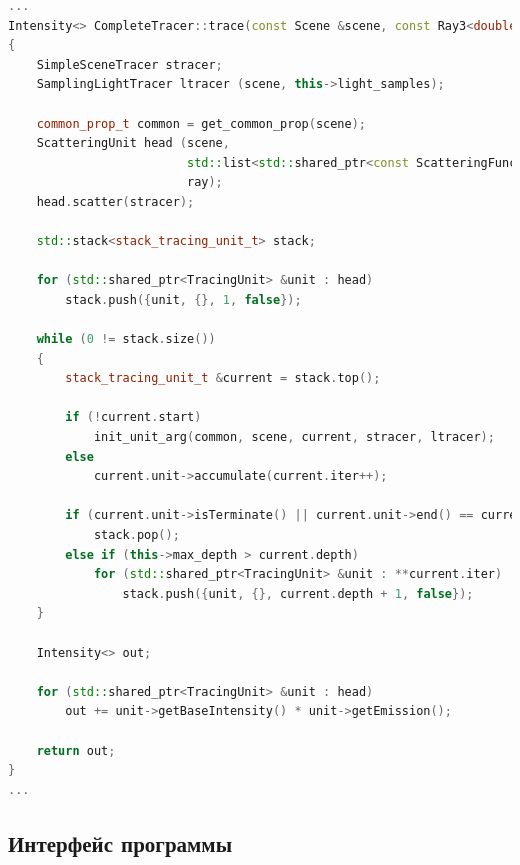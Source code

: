 


\begin{lstlisting}[language=c++, label={code_complete_tracer-cpp}, caption={Листинг кода трассировщика в алогритме трассировки путей (2)}]
...
Intensity<> CompleteTracer::trace(const Scene &scene, const Ray3<double> &ray) const
{
    SimpleSceneTracer stracer;
    SamplingLightTracer ltracer (scene, this->light_samples);

    common_prop_t common = get_common_prop(scene);
    ScatteringUnit head (scene,
                         std::list<std::shared_ptr<const ScatteringFunction>>(),
                         ray);
    head.scatter(stracer);

    std::stack<stack_tracing_unit_t> stack;

    for (std::shared_ptr<TracingUnit> &unit : head)
        stack.push({unit, {}, 1, false});

    while (0 != stack.size())
    {
        stack_tracing_unit_t &current = stack.top();

        if (!current.start)
            init_unit_arg(common, scene, current, stracer, ltracer);
        else
            current.unit->accumulate(current.iter++);

        if (current.unit->isTerminate() || current.unit->end() == current.iter)
            stack.pop();
        else if (this->max_depth > current.depth)
            for (std::shared_ptr<TracingUnit> &unit : **current.iter)
                stack.push({unit, {}, current.depth + 1, false});
    }

    Intensity<> out;

    for (std::shared_ptr<TracingUnit> &unit : head)
        out += unit->getBaseIntensity() * unit->getEmission();

    return out;
}
...
\end{lstlisting}

\subsection{Интерфейс программы}

